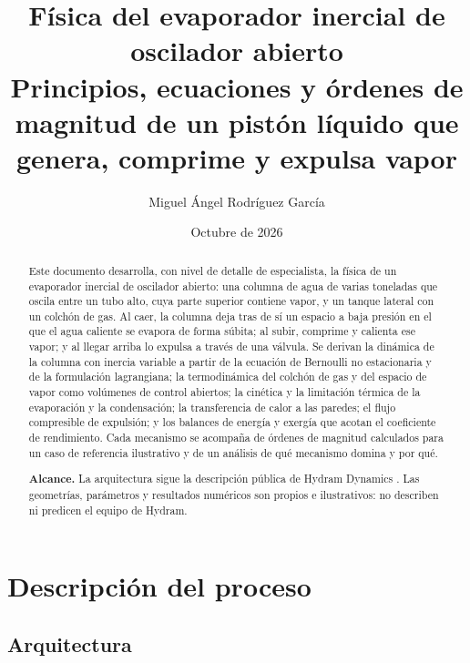 \documentclass[11pt,a4paper]{article}
\title{\textbf{Física del evaporador inercial de oscilador abierto}\\[4pt]
\large Principios, ecuaciones y órdenes de magnitud de un pistón líquido que genera, comprime y expulsa vapor}
\author{Miguel Ángel Rodríguez García}
\date{Octubre de 2026}
\begin{document}
\maketitle

\begin{abstract}
\noindent Este documento desarrolla, con nivel de detalle de especialista, la física de un evaporador inercial de oscilador abierto: una columna de agua de varias toneladas que oscila entre un tubo alto, cuya parte superior contiene vapor, y un tanque lateral con un colchón de gas. Al caer, la columna deja tras de sí un espacio a baja presión en el que el agua caliente se evapora de forma súbita; al subir, comprime y calienta ese vapor; y al llegar arriba lo expulsa a través de una válvula. Se derivan la dinámica de la columna con inercia variable a partir de la ecuación de Bernoulli no estacionaria y de la formulación lagrangiana; la termodinámica del colchón de gas y del espacio de vapor como volúmenes de control abiertos; la cinética y la limitación térmica de la evaporación y la condensación; la transferencia de calor a las paredes; el flujo compresible de expulsión; y los balances de energía y exergía que acotan el coeficiente de rendimiento. Cada mecanismo se acompaña de órdenes de magnitud calculados para un caso de referencia ilustrativo y de un análisis de qué mecanismo domina y por qué.

\smallskip\noindent\textbf{Alcance.} La arquitectura sigue la descripción pública de Hydram Dynamics \cite{hydramweb,hydramtech,hydramtcw}. Las geometrías, parámetros y resultados numéricos son propios e ilustrativos: no describen ni predicen el equipo de Hydram.
\end{abstract}

\tableofcontents
\newpage

\section{Descripción del proceso}

\subsection{Arquitectura}
\end{document}
